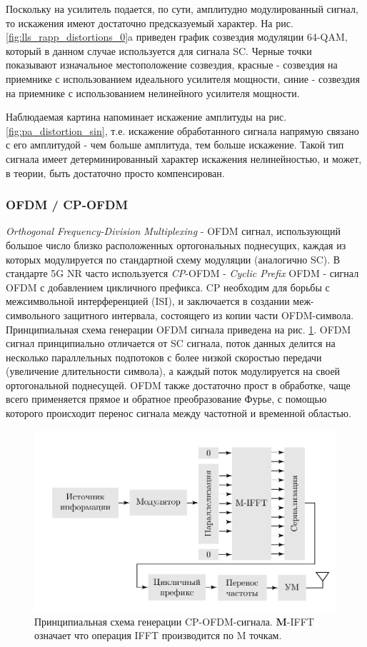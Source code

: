 Поскольку на усилитель подается, по сути, амплитудно модулированный сигнал,
то искажения имеют достаточно предсказуемый характер. На рис.
\ref{fig:lls_rapp_distortions_0}a приведен график созвездия модуляции
64-QAM, который в данном случае используется для сигнала SC. Черные точки
показывают изначальное местоположение созвездия, красные - созвездия на
приемнике с использованием идеального усилителя мощности, синие - созвездия
на приемнике с использованием нелинейного усилителя мощности. 

Наблюдаемая картина напоминает искажение амплитуды на рис.
\ref{fig:pa_distortion_sin}, т.е. искажение обработанного сигнала напрямую
связано с его амплитудой - чем больше амплитуда, тем больше искажение.
Такой тип сигнала имеет детерминированный характер искажения нелинейностью,
и может, в теории, быть достаточно просто компенсирован.


\subsubsection{OFDM / CP-OFDM}
\textit{Orthogonal Frequency-Division Multiplexing} - OFDM сигнал,
использующий большое число близко расположенных ортогональных поднесущих,
каждая из которых модулируется по стандартной схему модуляции (аналогично
SC). В стандарте 5G NR часто используется \textit{CP}-OFDM - \textit{Cyclic
Prefix} OFDM - сигнал OFDM с добавлением цикличного префикса. CP необходим
для борьбы с межсимвольной интерференцией (ISI), и заключается в создании
меж-символьного защитного интервала, состоящего из копии части
OFDM-символа. Принципиальная схема генерации OFDM сигнала приведена на рис.
\ref{fig:ofdm_scheme}. OFDM сигнал принципиально отличается от SC сигнала,
поток данных делится на несколько параллельных подпотоков с более низкой
скоростью передачи (увеличение длительности символа), а каждый поток
модулируется на своей ортогональной поднесущей. OFDM также достаточно прост
в обработке, чаще всего применяется прямое и обратное преобразование Фурье,
с помощью которого происходит перенос сигнала между частотной и временной
областью.
\begin{figure}[h!]
    \centering
    \includegraphics[scale=1]{figs/ofdm_scheme.pdf}
    \caption{Принципиальная схема генерации CP-OFDM-сигнала.
    \textbf{M}-IFFT означает что операция IFFT производится по M точкам.}
    \label{fig:ofdm_scheme}
\end{figure}

